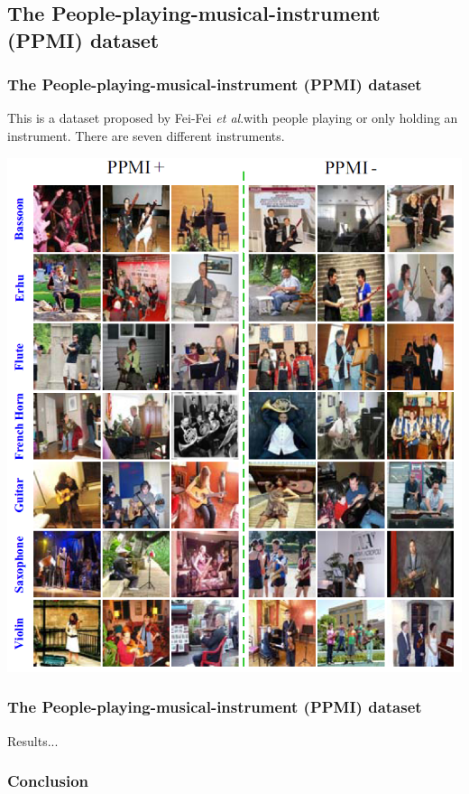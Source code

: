 \documentclass{beamer}
\def\etal{\emph{et al}.}
\begin{document}
\subsection{The People-playing-musical-instrument (PPMI) dataset}
\begin{frame}
\frametitle{The People-playing-musical-instrument (PPMI) dataset}

This is a dataset proposed by Fei-Fei \etal with people playing or only holding an instrument.
There are seven different instruments. 

\center 
\includegraphics[height=0.6\linewidth]{figs/ppmi.png}

\end{frame}


\begin{frame}
\frametitle{The People-playing-musical-instrument (PPMI) dataset}
Results...
\end{frame}

\begin{frame}
\frametitle{Conclusion}


\end{frame}
\end{document}
